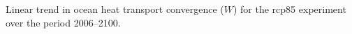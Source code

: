 \label{fig:htc}
Linear trend in ocean heat transport convergence ($W$) for the rcp85 experiment over the period 2006--2100.